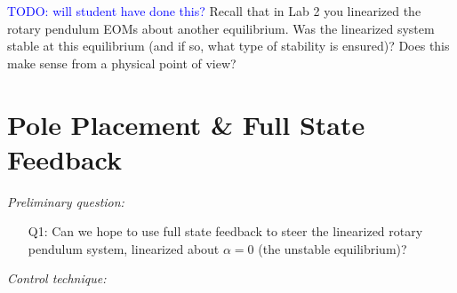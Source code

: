 \textcolor{blue}{TODO: will student have done this?}
Recall that in Lab 2 you linearized the rotary pendulum EOMs about another equilibrium. Was the linearized system stable at this equilibrium (and if so, what type of stability is ensured)? Does this make sense from a physical point of view?\\

\section{Pole Placement \& Full State Feedback}\label{section:lab3_feedback}
\emph{Preliminary question:}
\begin{enumerate}
    \item[Q1:] Can we hope to use full state feedback to steer the linearized rotary pendulum system, linearized about $\alpha = 0$ (the unstable equilibrium)?\\
\end{enumerate}
\emph{Control technique:}

